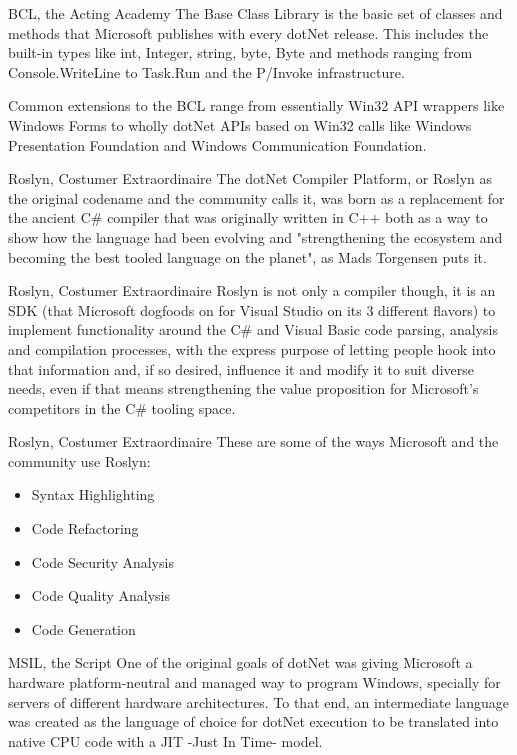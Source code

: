 \documentclass[10pt]{beamer}
\begin{document}
\begin{frame}{BCL, the Acting Academy}
The Base Class Library is the basic set of classes and methods that Microsoft publishes with every dotNet release. This includes the built-in types like int, Integer, string, byte, Byte and methods ranging from Console.WriteLine to Task.Run and the P/Invoke infrastructure. 

Common extensions to the BCL range from essentially Win32 API wrappers like Windows Forms to wholly dotNet APIs based on Win32 calls like Windows Presentation Foundation and Windows Communication Foundation.
\end{frame}

\begin{frame}{Roslyn, Costumer Extraordinaire}
The dotNet Compiler Platform, or Roslyn as the original codename and the community calls it, was born as a replacement for the ancient C\# compiler that was originally written in C++ both as a way to show how the language had been evolving and "strengthening the ecosystem and becoming the best tooled language on the planet", as Mads Torgensen puts it.
\end{frame}

\begin{frame}{Roslyn, Costumer Extraordinaire}
Roslyn is not only a compiler though, it is an SDK (that Microsoft dogfoods on for Visual Studio on its 3 different flavors) to implement functionality around the C\# and Visual Basic code parsing, analysis and compilation processes, with the express purpose of letting people hook into that information and, if so desired, influence it and modify it to suit diverse needs, even if that means strengthening the value proposition for Microsoft's competitors in the C\# tooling space.
\end{frame}

\begin{frame}{Roslyn, Costumer Extraordinaire}
These are some of the ways Microsoft and the community use Roslyn:
\begin{itemize}
    \item Syntax Highlighting
    \item Code Refactoring
    \item Code Security Analysis
    \item Code Quality Analysis
    \item Code Generation
\end{itemize}
\end{frame}

\begin{frame}{MSIL, the Script}
One of the original goals of dotNet was giving Microsoft a hardware platform-neutral and managed way to program Windows, specially for servers of different hardware architectures. To that end, an intermediate language was created as the language of choice for dotNet execution to be translated into native CPU code with a JIT -Just In Time- model.
\end{frame}
\end{document}
